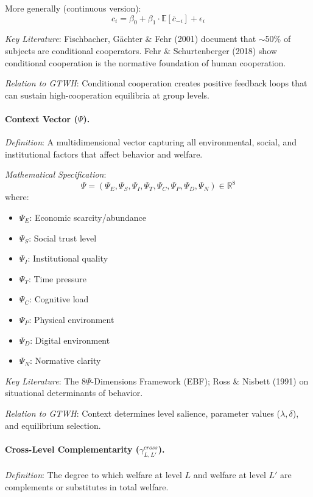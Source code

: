 \documentclass[12pt,a4paper]{article}
\begin{document}
More generally (continuous version):
\begin{equation}
c_i = \beta_0 + \beta_1 \cdot \mathbb{E}[\bar{c}_{-i}] + \epsilon_i
\end{equation}

\textit{Key Literature}: Fischbacher, Gächter \& Fehr (2001) document that $\sim$50\% 
of subjects are conditional cooperators. Fehr \& Schurtenberger (2018) show 
conditional cooperation is the normative foundation of human cooperation.

\textit{Relation to GTWH}: Conditional cooperation creates positive feedback loops 
that can sustain high-cooperation equilibria at group levels.

\medskip

\paragraph{Context Vector ($\Psi$).}
\textit{Definition}: A multidimensional vector capturing all environmental, social, 
and institutional factors that affect behavior and welfare.

\textit{Mathematical Specification}:
\begin{equation}
\Psi = (\Psi_E, \Psi_S, \Psi_I, \Psi_T, \Psi_C, \Psi_P, \Psi_D, \Psi_N) \in \mathbb{R}^8
\end{equation}
where:
\begin{itemize}[nosep]
\item $\Psi_E$: Economic scarcity/abundance
\item $\Psi_S$: Social trust level
\item $\Psi_I$: Institutional quality
\item $\Psi_T$: Time pressure
\item $\Psi_C$: Cognitive load
\item $\Psi_P$: Physical environment
\item $\Psi_D$: Digital environment
\item $\Psi_N$: Normative clarity
\end{itemize}

\textit{Key Literature}: The 8$\Psi$-Dimensions Framework (EBF); 
Ross \& Nisbett (1991) on situational determinants of behavior.

\textit{Relation to GTWH}: Context determines level salience, parameter values 
($\lambda, \delta$), and equilibrium selection.

\medskip

\paragraph{Cross-Level Complementarity ($\gamma^{cross}_{L,L'}$).}
\textit{Definition}: The degree to which welfare at level $L$ and welfare at 
level $L'$ are complements or substitutes in total welfare.
\end{document}
